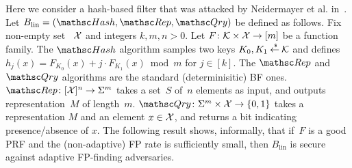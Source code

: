 Here we consider a hash-based filter that was attacked by Neidermayer et al. in~\cite{xxx}.  Let $B_{\mathrm{lin}}=(\Hash,\Rep,\Qry)$ be defined as follows.  Fix non-empty set ~${\cal X}$ and integers $k,m,n>0$.  Let $F\colon\mathcal{K} \times {\cal X} \to [m]$ be a function family.  The $\Hash$ algorithm samples two keys $K_0,K_1 {\:\stackrel{{\scriptscriptstyle \hspace{0.2em}\$}} {\leftarrow}\:} \mathcal{K}$ and defines $h_j(x) = F_{K_0}(x) + j\cdot F_{K_1}(x) \bmod m$ for $j \in [k]$.  The $\Rep$ and $\Qry$ algorithms are the standard (determinisitic) BF ones.  $\Rep\colon [\univ]^n \rightarrow \Sigma^m$ takes a set~$S$ of~$n$ elements as input, and outputs representation~$M$ of length~$m$. $\Qry\colon \Sigma^m \times \univ \rightarrow \bits$ takes a representation $M$ and an element $x \in {\cal X}$, and returns a bit indicating presence/absence of $x$. The following result shows, informally, that if~$F$ is a good PRF and the (non-adaptive) FP rate is sufficiently small, then $B_\mathrm{lin}$ is secure against adaptive FP-finding adversaries.

